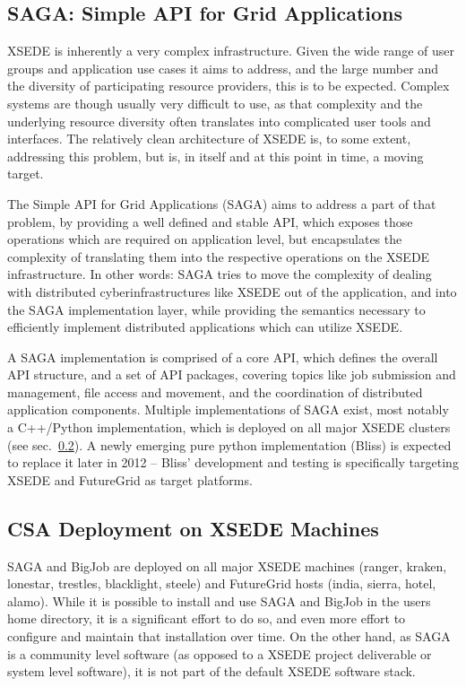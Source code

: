 \documentclass{sig-alternate}
\begin{document}
\subsection{SAGA: Simple API for Grid Applications}
 \label{ssec:saga}

XSEDE is inherently a very complex infrastructure.  Given the wide
range of user groups and application use cases it aims to address,
and the large number and the diversity of participating resource
providers, this is to be expected.  Complex systems are though
usually very difficult to use, as that complexity and the underlying
resource diversity often translates into complicated user tools and
interfaces.  The relatively clean architecture of XSEDE is, to some
extent, addressing this problem, but is, in itself and at this point
in time, a moving target.

The Simple API for Grid Applications (SAGA) aims to address a part of
that problem, by providing a well defined and stable API, which
exposes those operations which are required on application level, but
encapsulates the complexity of translating them into the respective
operations on the XSEDE infrastructure.  In other words: SAGA tries
to move the complexity of dealing with distributed
cyberinfrastructures like XSEDE out of the application, and into the
SAGA implementation layer, while providing the semantics necessary to
efficiently implement distributed applications which can utilize
XSEDE.

A SAGA implementation is comprised of a
core API, which defines the overall API structure, and a set of API
packages, covering topics like job submission and management, file
access and movement, and the coordination of distributed application
components.  Multiple implementations of SAGA exist, most notably a
C++/Python implementation, which is deployed on all major XSEDE
clusters (see sec.~\ref{ssec:csa}).  A newly emerging pure python
implementation (Bliss) is expected to replace it later in 2012 --
Bliss' development and testing is specifically targeting XSEDE and
FutureGrid as target platforms.

\subsection{CSA Deployment on XSEDE Machines}
 \label{ssec:csa}

 SAGA and BigJob are deployed on all major XSEDE machines (ranger,
 kraken, lonestar, trestles, blacklight, steele) and FutureGrid hosts
 (india, sierra, hotel, alamo).  While it is possible to install and
 use SAGA and BigJob in the users home directory, it is a significant
 effort to do so, and even more effort to configure and maintain that
 installation over time. On the other hand, as SAGA is a community
 level software (as opposed to a XSEDE project deliverable or system
 level software), it is not part of the default XSEDE software stack.
\end{document}
